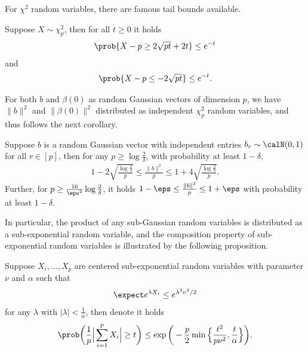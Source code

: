For $\chi^2$ random variables, there are famous tail bounds available.
\begin{lemma}\label{lem:chi-squared-tail}
    Suppose $X\sim \chi^2_p$, then for all $t\geq 0$ it holds
    \begin{align*}
        \prob\{X-p \geq 2\sqrt{pt} + 2t\} \leq e^{-t}
    \end{align*}
    and
    \begin{align*}
        \prob\{X-p \leq -2\sqrt{pt}\} \leq e^{-t}.
    \end{align*}
\end{lemma}
For both $b$ and $\beta(0)$ as random Gaussian vectors of dimension $p$, we have $\|b\|^2$ and $\|\beta(0)\|^2$ distributed as independent $\chi^2_p$ random variables, and thus follows the next corollary.
\begin{corollary}\label{cor:b-norm-concentration}
    Suppose $b$ is a random Gaussian vector with independent entries $b_r\sim\calN(0,1)$ for all $r\in[p]$, then for any $p \geq \log\frac{2}{\delta}$, with probability at least $1-\delta$, 
    \begin{align*}
        1 - 2\sqrt{\frac{\log\frac{2}{\delta}}{p}} \leq \frac{\|b\|^2}{p} \leq 1 + 4\sqrt{\frac{\log\frac{2}{\delta}}{p}}.
    \end{align*}
    Further, for $p \geq \frac{16}{\eps^2}\log\frac{2}{\delta}$, it holds $1-\eps \leq \frac{\|b\|^2}{p} \leq 1+\eps$ with probability at least $1-\delta$.
\end{corollary}
In particular, the product of any sub-Gaussian random variables is distributed as a sub-exponential random variable, and the composition property of \iid sub-exponential random variables is illustrated by the following proposition.
\begin{proposition}\label{prop:subexponential}
    Suppose $X_i,\ldots,X_p$ are \iid centered sub-exponential random variables with parameter $\nu$ and $\alpha$ such that 
    \begin{align*}
        \expect e^{\lambda X_i} \leq e^{\lambda^2\nu^2/2}
    \end{align*}
    for any $\lambda$ with $|\lambda|<\frac{1}{\alpha}$, then denote it holds
    \begin{align*}
        \prob\bigg( \frac{1}{p}\Big|\sum_{i=1}^p X_i\Big| \geq t \bigg) \leq \exp\bigg( -\frac{p}{2}\min\Big\{ \frac{t^2}{p\nu^2}, \frac{t}{\alpha} \Big\} \bigg).
    \end{align*}
\end{proposition}
